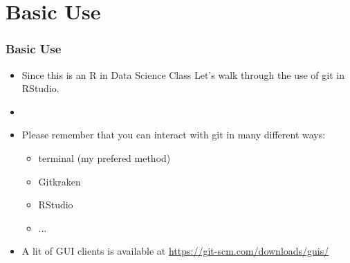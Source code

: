\section{Basic Use}
\begin{frame}
  \frametitle{Basic Use}
  \begin{itemize}
    \item Since this is an R in Data Science Class Let's walk through the use of
      git in RStudio.
    \item[]
    \item Please remember that you can interact with git in many different ways:
      \begin{itemize}
        \item terminal (my prefered method)
        \item Gitkraken
        \item RStudio
        \item ...
      \end{itemize}
    \item A lit of GUI clients is available at \url{https://git-scm.com/downloads/guis/}
  \end{itemize}
\end{frame}
